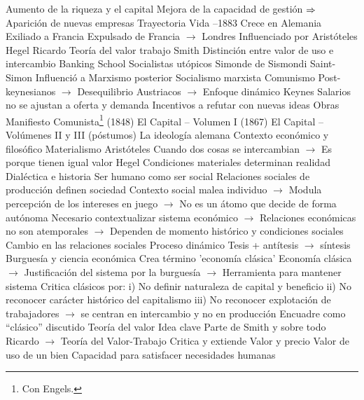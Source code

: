 \documentclass{nuevotema}
\begin{document}
\begin{esquemal}
				\4[] Aumento de la riqueza y el capital
				\4[] Mejora de la capacidad de gestión
				\4[] $\then$ Aparición de nuevas empresas
	\1 
		\2 Trayectoria
			\3 Vida
				--1883
				\4 Crece en Alemania
				\4 Exiliado a Francia
				\4 Expulsado de Francia $\to$ Londres
			\3 Influenciado por
				\4 Aristóteles
				\4 Hegel
				\4 Ricardo
				\4[] Teoría del valor trabajo
				\4 Smith
				\4[] Distinción entre valor de uso e intercambio
				\4 Banking School
				\4 Socialistas utópicos
				\4 Simonde de Sismondi
				\4 Saint-Simon
			\3 Influenció a
				\4 Marxismo posterior
				\4 Socialismo marxista
				\4 Comunismo
				\4 Post-keynesianos
				\4[] $\to$ Desequilibrio
				\4 Austriacos
				\4[] $\to$ Enfoque dinámico
				\4 Keynes
				\4[] Salarios no se ajustan a oferta y demanda
				\4 Incentivos a refutar con nuevas ideas
			\3 Obras
				\4 Manifiesto Comunista\footnote{Con Engels.} (1848)
				\4 El Capital -- Volumen I (1867)
				\4 El Capital -- Volúmenes II y III (póstumos)
				\4 La ideología alemana
		\2 Contexto económico y filosófico
			\3 Materialismo
				\4 Aristóteles
				\4[] Cuando dos cosas se intercambian
				\4[] $\to$ Es porque tienen igual valor
				\4 Hegel
				\4[] Condiciones materiales determinan realidad
			\3 Dialéctica e historia
				\4 Ser humano como ser social
				\4[] Relaciones sociales de producción definen sociedad
				\4[] Contexto social malea individuo
				\4[] $\to$ Modula percepción de los intereses en juego
				\4[] $\to$ No es un átomo que decide de forma autónoma
				\4[$\then$] Necesario contextualizar sistema económico
				\4[] $\to$ Relaciones económicas no son atemporales
				\4[] $\to$ Dependen de momento histórico y condiciones sociales
				\4 Cambio en las relaciones sociales
				\4[] Proceso dinámico
				\4[] Tesis + antítesis $\to$ síntesis
			\3 Burguesía y ciencia económica
				\4 Crea término 'economía clásica'
				\4 Economía clásica
				\4[] $\to$ Justificación del sistema por la burguesía
				\4[] $\to$ Herramienta para mantener sistema
				\4 Critica clásicos por:
				\4[] i) No definir naturaleza de capital y beneficio
				\4[] ii) No reconocer carácter histórico del capitalismo
				\4[] iii) No reconocer explotación de trabajadores
				\4[] $\to$ se centran en intercambio y no en producción
				\4[$\Rightarrow$] Encuadre como ``clásico'' discutido
		\2 Teoría del valor
			\3 Idea clave
				\4 Parte de Smith y sobre todo Ricardo
				\4[] $\to$ Teoría del Valor-Trabajo
				\4 Critica y extiende
			\3 Valor y precio
				\4 Valor de uso de un bien
				\4[] Capacidad para satisfacer necesidades humanas

\end{esquemal}
\end{document}
